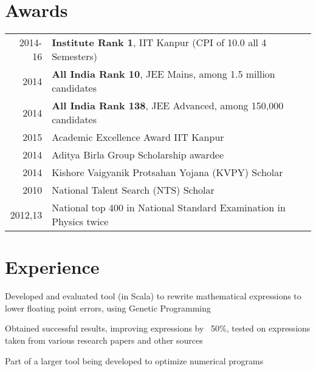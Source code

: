 \documentclass[a4paper]{deedy-resume} %
\begin{document}
\begin{minipage}[t]{0.66\textwidth}

  \section{Awards}

  \begin{tabular}{rll}
    2014-16	 & \textbf{Institute Rank 1}, IIT Kanpur (CPI of 10.0 all 4 Semesters)\\
    2014	 & \textbf{All India Rank 10}, JEE Mains, among 1.5 million candidates\\
    2014	 & \textbf{All India Rank 138}, JEE Advanced, among 150,000 candidates\\
    2015	 & Academic Excellence Award IIT Kanpur\\
    2014   & Aditya Birla Group Scholarship awardee\\
    2014   & Kishore Vaigyanik Protsahan Yojana (KVPY) Scholar\\
    2010   & National Talent Search (NTS) Scholar\\
    2012,13 & National top 400 in National Standard Examination
              in Physics twice
  \end{tabular}

  \sectionspace %


  \section{Experience}

  \runsubsection{}
   
  \vspace{\topsep}
  \begin{tightitemize}
  \item Developed and evaluated tool (in Scala) to rewrite
    mathematical expressions to lower floating point errors, using
    Genetic Programming
  \item	Obtained successful results, improving expressions by ~50\%,
    tested on expressions taken from various research papers and other
    sources
  \item Part of a larger tool being developed to optimize numerical
    programs
  \end{tightitemize}

  \sectionspace

  \runsubsection{}
   


\end{minipage}
\end{document}
